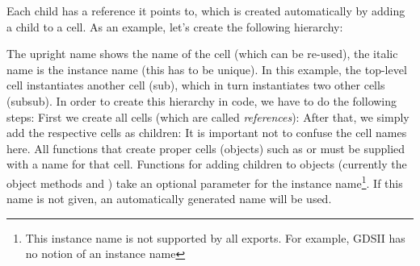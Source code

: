 Each child has a reference it points to, which is created automatically by adding a child to a cell.
As an example, let's create the following hierarchy:
\begin{center}
\end{center}
The upright name shows the name of the cell (which can be re-used), the italic name is the instance name (this has to be unique).
In this example, the top-level cell instantiates another cell (sub), which in turn instantiates two other cells (subsub).
In order to create this hierarchy in code, we have to do the following steps:
First we create all cells (which are called \emph{references}):
After that, we simply add the respective cells as children:
It is important not to confuse the cell names here.
All functions that create proper cells (objects) such as  or  must be supplied with a name for that cell.
Functions for adding children to objects (currently the object methods  and ) take an optional parameter for the instance name\footnote{This instance name is not supported by all exports. For example, GDSII has no notion of an instance name}.
If this name is not given, an automatically generated name will be used.


